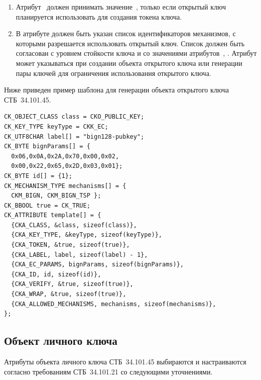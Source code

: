 \begin{enumerate}
\item
Атрибут~ должен принимать значение~,
только если открытый ключ планируется использовать для создания
токена ключа.

\item
В атрибуте  должен быть указан список 
идентификаторов механизмов, с которыми разрешается использовать открытый 
ключ. Список должен быть согласован с уровнем стойкости ключа и со 
значениями атрибутов~, . 
%
Атрибут может указываться при создании объекта открытого ключа или 
генерации пары ключей для ограничения использования открытого ключа.
\end{enumerate}
 
Ниже приведен пример шаблона для генерации объекта открытого ключа 
СТБ~34.101.45.

\begin{verbatim}
CK_OBJECT_CLASS class = CKO_PUBLIC_KEY;
CK_KEY_TYPE keyType = CKK_EC;
CK_UTF8CHAR label[] = "bign128-pubkey";
CK_BYTE bignParams[] = {
  0x06,0x0A,0x2A,0x70,0x00,0x02,
  0x00,0x22,0x65,0x2D,0x03,0x01};
CK_BYTE id[] = {1};
CK_MECHANISM_TYPE mechanisms[] = {
  CKM_BIGN, CKM_BIGN_TSP };
CK_BBOOL true = CK_TRUE;
CK_ATTRIBUTE template[] = {
  {CKA_CLASS, &class, sizeof(class)},
  {CKA_KEY_TYPE, &keyType, sizeof(keyType)},
  {CKA_TOKEN, &true, sizeof(true)},
  {CKA_LABEL, label, sizeof(label) - 1},
  {CKA_EC_PARAMS, bignParams, sizeof(bignParams)},
  {CKA_ID, id, sizeof(id)},
  {CKA_VERIFY, &true, sizeof(true)},
  {CKA_WRAP, &true, sizeof(true)},
  {CKA_ALLOWED_MECHANISMS, mechanisms, sizeof(mechanisms)},
};
\end{verbatim}

\subsection{Объект личного ключа}\label{CRYPTOKI.Privkey}

Атрибуты объекта личного ключа СТБ~34.101.45 выбираются и настраиваются согласно
требованиям СТБ~34.101.21 со следующими уточнениями.

